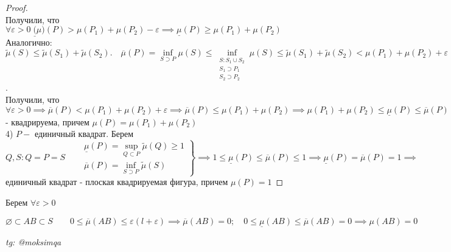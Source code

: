 \documentclass[../main.tex]{subfiles}
\begin{document}
\begin{proof}
    \\ Получили, что $\forall \varepsilon>0 \; \underline(\mu)(P)> \mu(P_{1})+\mu(P_{2})-\varepsilon\implies \underline{\mu}(P)\geqslant \mu(P_{1})+\mu(P_{2})$
    \\ Аналогично: $\tilde{\mu}(S)\leqslant \tilde{\mu}(S_{1})+\tilde{\mu}(S_{2}). \quad \overline{\mu}(P)=\underset{S\supset P}{\inf}{\mu(S)}\leqslant \underset{\substack{S: S_{1}\cup S_{2} \\ S_{1} \supset P_{1}\\S_{2} \supset P_{2}}}{\inf}{\mu(S)}\leqslant \tilde{\mu}(S_{1})+\tilde{\mu}(S_{2})< \mu(P_{1})+\mu(P_{2})+\varepsilon$. 
    \\ Получили, что $ \forall \varepsilon>0 \implies \overline{\mu}(P)<\mu(P_{1})+\mu(P_{2})+\varepsilon\implies \overline{\mu}(P)\leqslant \mu(P_{1})+\mu(P_{2})\implies \mu(P_{1}) +\mu(P_{2})\leqslant \underline{\mu}(P) \leqslant \overline{\mu}(P)\leqslant \mu(P_{1})+\mu(P_{2})\implies \underline{\mu}(P)=\overline{\mu}(P)=\mu(P_{1})+\mu(P_{2})\implies P$ - квадрируема, причем $\mu(P)=\mu(P_{1})+\mu(P_{2})$
    \\4) $P-$ единичный квадрат. Берем $Q,S : Q=P=S\quad \left.\begin{aligned}&\underline{\mu}(P)=\underset{Q \subset P}{\sup}{\tilde{\mu}(Q)}\geqslant 1\\ &\overline{\mu}(P)=\underset{S\supset P}{\inf}{\tilde{\mu}(S)}\end{aligned}\right\} \implies 1\leqslant \underline{\mu}(P )\leqslant \overline{\mu}(P)\leqslant 1 \implies \underline{\mu}(P)=\overline{\mu}(P)=1\implies$ единичный квадрат - плоская квадрируемая фигура, причем $\mu(P)=1$
 \end{proof}
Берем $\forall \varepsilon>0 $
 \begin{center} 
\end{center}
 $\varnothing \subset AB \subset S\qquad 0\leqslant \overline{\mu}(AB)\leqslant \varepsilon(l+\varepsilon)\implies \overline{\mu}(AB)=0; \quad 0\leqslant \underline{\mu}(AB)\leqslant \overline{\mu}(AB)=0\implies \mu(AB)=0$

\vspace{1cm}
\begin{flushright}
    \textit{tg: @moksimqa}
\end{flushright}
\end{document}
